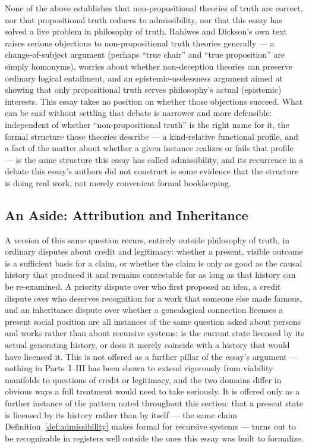\documentclass[11pt,a4paper]{article}
\theoremstyle{plain}
\theoremstyle{definition}
\theoremstyle{remark}
\begin{document}
None of the above establishes that non-propositional theories of truth are correct, nor that propositional truth reduces to admissibility, nor that this essay has solved a live problem in philosophy of truth. Rahlwes and Dickson's own text raises serious objections to non-propositional truth theories generally — a change-of-subject argument (perhaps ``true chair'' and ``true proposition'' are simply homonyms), worries about whether non-deception theories can preserve ordinary logical entailment, and an epistemic-uselessness argument aimed at showing that only propositional truth serves philosophy's actual (epistemic) interests. This essay takes no position on whether those objections succeed. What can be said without settling that debate is narrower and more defensible: independent of whether ``non-propositional truth'' is the right name for it, the formal structure those theories describe — a kind-relative functional profile, and a fact of the matter about whether a given instance realizes or fails that profile — is the same structure this essay has called admissibility, and its recurrence in a debate this essay's authors did not construct is some evidence that the structure is doing real work, not merely convenient formal bookkeeping.

\subsection{An Aside: Attribution and Inheritance}
\label{subsec:attribution-aside}

A version of this same question recurs, entirely outside philosophy of truth, in ordinary disputes about credit and legitimacy: whether a present, visible outcome is a sufficient basis for a claim, or whether the claim is only as good as the causal history that produced it and remains contestable for as long as that history can be re-examined. A priority dispute over who first proposed an idea, a credit dispute over who deserves recognition for a work that someone else made famous, and an inheritance dispute over whether a genealogical connection licenses a present social position are all instances of the same question asked about persons and works rather than about recursive systems: is the current state licensed by its actual generating history, or does it merely coincide with a history that would have licensed it. This is not offered as a further pillar of the essay's argument — nothing in Parts~I--III has been shown to extend rigorously from viability manifolds to questions of credit or legitimacy, and the two domains differ in obvious ways a full treatment would need to take seriously. It is offered only as a further instance of the pattern noted throughout this section: that a present state is licensed by its history rather than by itself — the same claim Definition~\ref{def:admissibility} makes formal for recursive systems — turns out to be recognizable in registers well outside the ones this essay was built to formalize.
\end{document}
